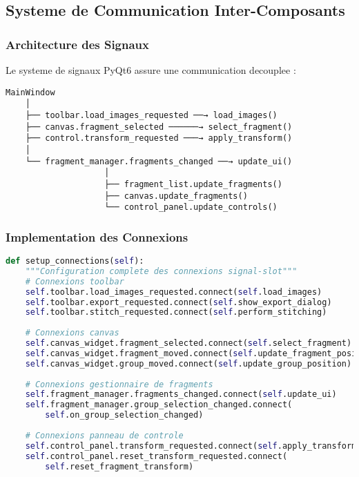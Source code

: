\documentclass[12pt,a4paper]{article}
\begin{document}
\subsection{Systeme de Communication Inter-Composants}

\subsubsection{Architecture des Signaux}

Le systeme de signaux PyQt6 assure une communication decouplee :

\begin{verbatim}
MainWindow
    │
    ├── toolbar.load_images_requested ──→ load_images()
    ├── canvas.fragment_selected ──────→ select_fragment()
    ├── control.transform_requested ───→ apply_transform()
    │
    └── fragment_manager.fragments_changed ──→ update_ui()
                    │
                    ├── fragment_list.update_fragments()
                    ├── canvas.update_fragments()
                    └── control_panel.update_controls()
\end{verbatim}

\subsubsection{Implementation des Connexions}

\begin{lstlisting}[language=Python]
def setup_connections(self):
    """Configuration complete des connexions signal-slot"""
    # Connexions toolbar
    self.toolbar.load_images_requested.connect(self.load_images)
    self.toolbar.export_requested.connect(self.show_export_dialog)
    self.toolbar.stitch_requested.connect(self.perform_stitching)
    
    # Connexions canvas
    self.canvas_widget.fragment_selected.connect(self.select_fragment)
    self.canvas_widget.fragment_moved.connect(self.update_fragment_position)
    self.canvas_widget.group_moved.connect(self.update_group_position)
    
    # Connexions gestionnaire de fragments
    self.fragment_manager.fragments_changed.connect(self.update_ui)
    self.fragment_manager.group_selection_changed.connect(
        self.on_group_selection_changed)
    
    # Connexions panneau de controle
    self.control_panel.transform_requested.connect(self.apply_transform)
    self.control_panel.reset_transform_requested.connect(
        self.reset_fragment_transform)
\end{lstlisting}
\end{document}
